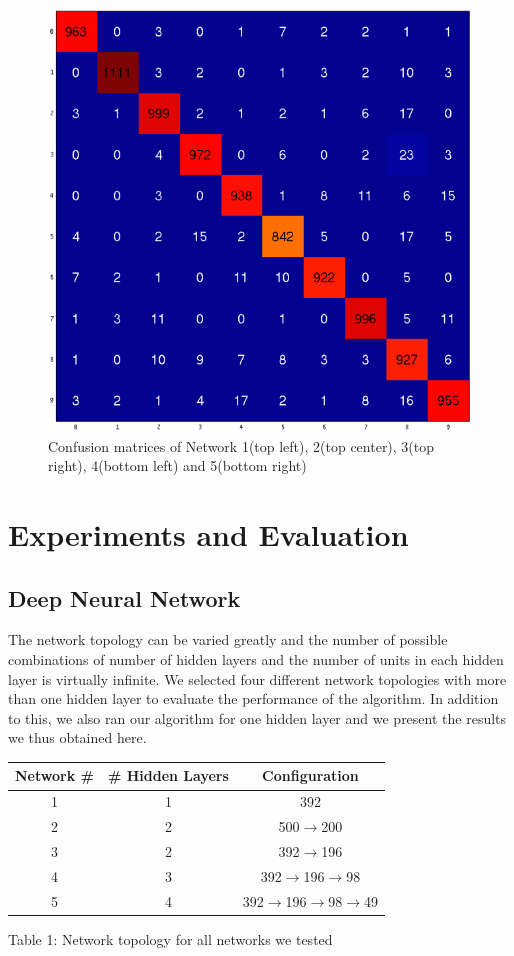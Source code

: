 \documentclass[10pt,twocolumn,letterpaper]{article}
\begin{document}
\begin{figure}
\begin{center}
	\includegraphics[scale=0.25]{../images/confusion_4.png}
\end{center}
	\caption{Confusion matrices of Network 1(top left), 2(top center), 3(top right), 4(bottom left) and 5(bottom right)}
	\label{fig:confusion}
\end{figure}
\section{Experiments and Evaluation}
\subsection{Deep Neural Network}
The network topology can be varied greatly and the number of possible combinations of number of hidden layers and the number of units in each hidden layer is virtually infinite. We selected four different network topologies with more than one hidden layer to evaluate the performance of the algorithm. In addition to this, we also ran our algorithm for one hidden layer and we present the results we thus obtained here.
\begin{center}
\begin{tabular}{|c|c|c|}
	\hline
	\textbf{Network \#} & \textbf{\# Hidden Layers} & \textbf{Configuration}\\ \hline \hline
	1 & 1 & 392\\ \hline
	2 & 2 & 500$\rightarrow$200\\ \hline
	3 & 2 & 392$\rightarrow$196\\ \hline
	4 & 3 & 392$\rightarrow$196$\rightarrow$98\\ \hline
	5 & 4 & 392$\rightarrow$196$\rightarrow$98$\rightarrow$49\\ \hline
\end{tabular}
\end{center}
\begin{center}
	Table 1: Network topology for all networks we tested
\end{center}
\end{document}
